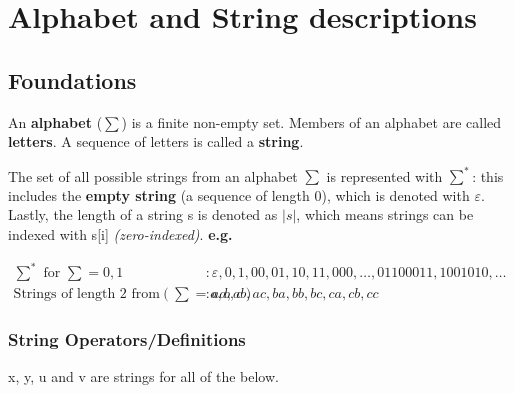 \section{Alphabet and String descriptions}

\subsection{Foundations}
An \textbf{alphabet} ($\sum$) is a finite non-empty set. Members of an alphabet are  called \textbf{letters}. A sequence of letters is called a \textbf{string}.

The set of all possible strings from an alphabet $\sum$ is represented with $\sum^*$: this includes the \textbf{empty string} (a sequence of length 0), which is denoted with $\varepsilon$. Lastly, the length of a string s is denoted as $|s|$, which means strings can be indexed with s[i] \emph{(zero-indexed)}. \textbf{e.g.}

\begin{align}
    \sum\nolimits^* \text{ for } \sum\nolimits = {0,1} &: {\varepsilon,0,1,00,01,10,11,000,\dots,01100011,1001010,\dots} \nonumber\\
    \text{Strings of length 2 from} \left(\sum\nolimits = {a,b,c}\right) &:  {aa,ab,ac,ba,bb,bc,ca,cb,cc} \nonumber
\end{align}

\subsubsection{String Operators/Definitions}
x, y, u and v are strings for all of the below.
 
